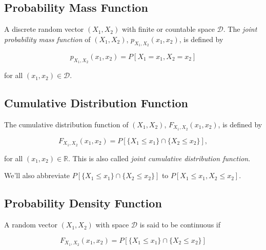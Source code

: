 \documentclass{article}
\begin{document}
        \subsection*{Probability Mass Function}

            A discrete random vector $ (X_{1}, X_{2}) $ with finite or
            countable space $ \mathcal{D} $. The \textit{joint probability mass
            function} of $ (X_{1}, X_{2})$, $ p_{X_{1}, X_{2}}(x_{1}, x_{2}) $,
            is defined by

            \begin{equation*}
                p_{ X_{1}, X_{2}} (x_{1}, x_{2}) = P [ X_{1} = x_{1}, X_{2} = x_{2} ]
            \end{equation*}

            for all $ (x_{1}, x_{2}) \in \mathcal{D} $.

        \subsection*{Cumulative Distribution Function}

            The cumulative distribution function of $ (X_{1}, X_{2}) $, $ F_{X_{1}, X_{2}} (x_{1},
            x_{2}) $, is defined by

            \begin{equation*}
                  F_{X_{1}, X_{2}} (x_{1}, x_{2}) = P [  \{ X_{1} \leq x_{1} \}
                  \cap  \{ X_{2} \leq x_{2} \}],
            \end{equation*}

            for all $ (x_{1}, x_{2}) \in \mathbb{R} $. This is also called
            \textit{joint cumulative distribution function}.

            We'll also abbreviate $
            P [  \{ X_{1} \leq x_{1} \} \cap  \{ X_{2} \leq x_{2} \}] $ to
            $ P [ X_{1} \leq x_{1}, X_{2} \leq x_{2} ] $.

        \subsection*{Probability Density Function}

            A random vector $ (X_{1}, X_{2}) $ with space $ \mathcal{D} $ is
            said to be continuous if

            \begin{equation*}
                F_{X_{1}, X_{2}}(x_{1}, x_{2}) = P [  \{ X_{1} \leq x_{1} \}
                  \cap  \{ X_{2} \leq x_{2} \} ]
            \end{equation*}
\end{document}
